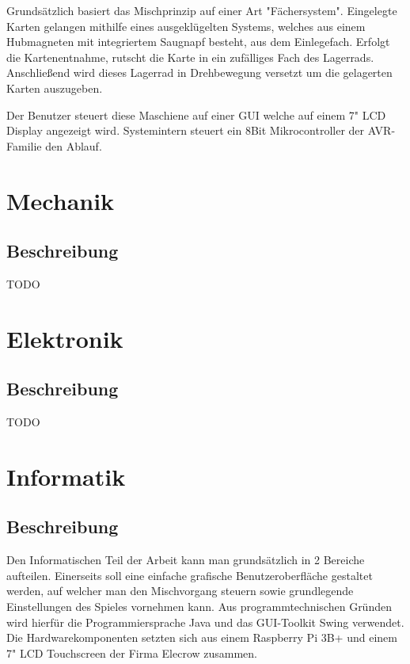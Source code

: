 Grundsätzlich basiert das Mischprinzip auf einer Art "Fächersystem".
Eingelegte Karten gelangen mithilfe eines ausgeklügelten Systems, welches aus einem Hubmagneten mit integriertem Saugnapf besteht, aus dem Einlegefach.
Erfolgt die Kartenentnahme, rutscht die Karte in ein zufälliges Fach des Lagerrads. Anschließend wird dieses Lagerrad in Drehbewegung versetzt um die gelagerten Karten auszugeben.

Der Benutzer steuert diese Maschiene auf einer GUI welche auf einem 7" LCD Display angezeigt wird. Systemintern steuert ein 8Bit Mikrocontroller der AVR-Familie den Ablauf.

\chapter{Mechanik}
\label{sec:Mechanik}
\section{Beschreibung}

TODO


\chapter{Elektronik}
\label{sec:Elektronik}
\section{Beschreibung}

TODO



\chapter{Informatik}
\label{sec:Informatik}
\section{Beschreibung}

Den Informatischen Teil der Arbeit kann man grundsätzlich in 2 Bereiche aufteilen. Einerseits soll eine einfache grafische Benutzeroberfläche gestaltet werden, auf welcher man den Mischvorgang steuern sowie grundlegende Einstellungen des Spieles vornehmen kann.
Aus programmtechnischen Gründen wird hierfür die Programmiersprache Java und das GUI-Toolkit Swing verwendet. \\
Die Hardwarekomponenten setzten sich aus einem Raspberry Pi 3B+ und einem 7" LCD Touchscreen der Firma Elecrow zusammen. \\

